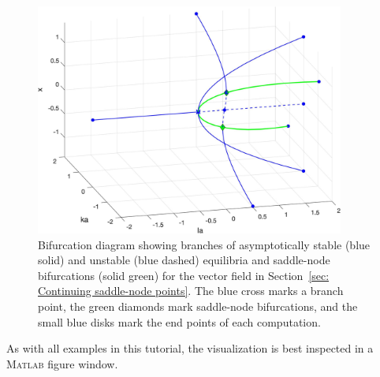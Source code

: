 \begin{figure}[h]
\centering
\includegraphics[width=4in]{Figures/Section3_3_1.jpg}
\caption{Bifurcation diagram showing branches of asymptotically stable (blue solid) and unstable (blue dashed) equilibria and saddle-node bifurcations (solid green) for the vector field in Section~\ref{sec: Continuing saddle-node points}. The blue cross marks a branch point, the green diamonds mark saddle-node bifurcations, and the small blue disks mark the end points of each computation.}
\label{fig: Section3_3_1}
\end{figure}
As with all examples in this tutorial, the visualization is best inspected in a \textsc{Matlab} figure window.

